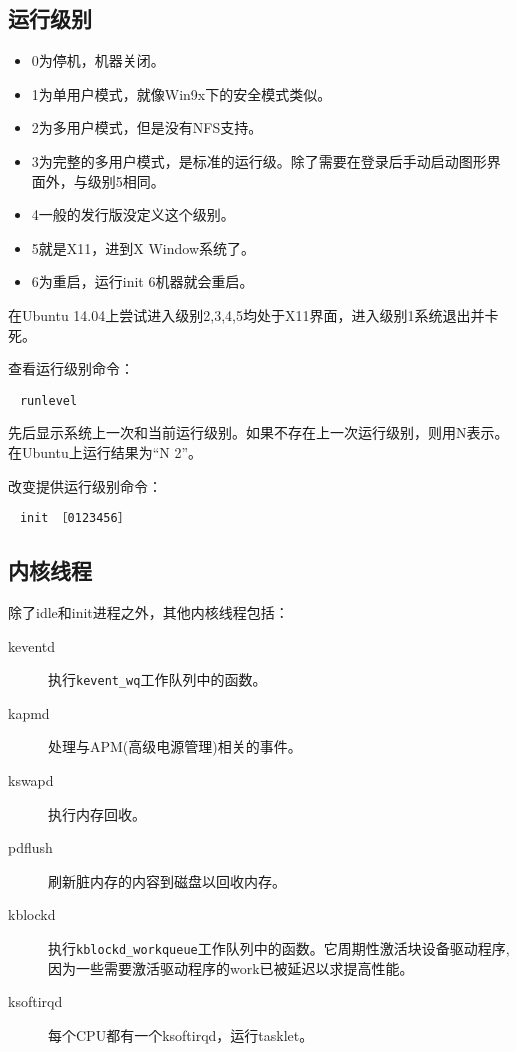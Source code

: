 \subsection{运行级别}
\begin{itemize}
  \item 0为停机，机器关闭。 
  \item 1为单用户模式，就像Win9x下的安全模式类似。 
  \item 2为多用户模式，但是没有NFS支持。 
  \item 3为完整的多用户模式，是标准的运行级。除了需要在登录后手动启动图形界面外，与级别5相同。
  \item 4一般的发行版没定义这个级别。
  \item 5就是X11，进到X Window系统了。 
  \item 6为重启，运行init 6机器就会重启。 
\end{itemize}
在Ubuntu 14.04上尝试进入级别2,3,4,5均处于X11界面，进入级别1系统退出并卡死。

查看运行级别命令：
　\begin{verbatim}
　runlevel
\end{verbatim}
先后显示系统上一次和当前运行级别。如果不存在上一次运行级别，则用N表示。在Ubuntu上运行结果为“N 2”。

改变提供运行级别命令：
　\begin{verbatim}
　init ［0123456］
\end{verbatim}


    
\subsection{内核线程}
除了idle和init进程之外，其他内核线程包括：
\begin{description}
  \item[keventd] 执行\verb$kevent_wq$工作队列中的函数。
  \item[kapmd] 处理与APM(高级电源管理)相关的事件。
  \item[kswapd] 执行内存回收。
  \item[pdflush] 刷新脏内存的内容到磁盘以回收内存。
  \item[kblockd] 执行\verb$kblockd_workqueue$工作队列中的函数。它周期性激活块设备驱动程序, 因为一些需要激活驱动程序的work已被延迟以求提高性能。
  \item[ksoftirqd] 每个CPU都有一个ksoftirqd，运行tasklet。
\end{description}




















    
    
    
    
    
    
    
    
    
    
    
    
    
